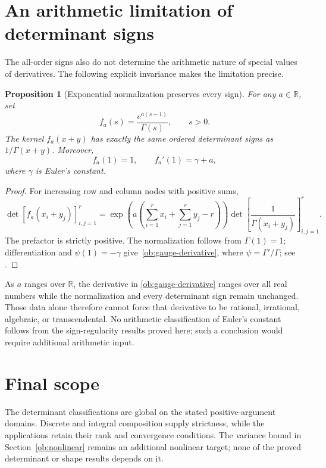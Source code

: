 \documentclass[11pt,a4paper]{article}
\newtheorem{proposition}[theorem]{Proposition}
\theoremstyle{definition}
\theoremstyle{remark}
\newcommand{\R}{\mathbb R}
\begin{document}
\section{An arithmetic limitation of determinant signs}
\label{ob:arithmetic}

The all-order signs also do not determine the arithmetic nature of
special values of derivatives. The following explicit invariance
makes the limitation precise.

\begin{proposition}[Exponential normalization preserves every sign]
\label{ob:gauge}
For any \(a\in\R\), set
\[
 f_a(s)=\frac{e^{a(s-1)}}{\Gamma(s)},\qquad s>0.
\]
The kernel \(f_a(x+y)\) has exactly the same ordered determinant
signs as \(1/\Gamma(x+y)\). Moreover,
\begin{equation}\label{ob:gauge-derivative}
 f_a(1)=1,\qquad f_a'(1)=\gamma+a,
\end{equation}
where \(\gamma\) is Euler's constant.
\end{proposition}

\begin{proof}
For increasing row and column nodes with positive sums,
\[
 \det[f_a(x_i+y_j)]_{i,j=1}^r
 =\exp\!\left(a\left(\sum_{i=1}^r x_i+
                       \sum_{j=1}^r y_j-r\right)\right)
   \det\!\left[\frac1{\Gamma(x_i+y_j)}\right]_{i,j=1}^r.
\]
The prefactor is strictly positive. The normalization follows from
\(\Gamma(1)=1\); differentiation and
\(\psi(1)=-\gamma\) give~\eqref{ob:gauge-derivative}, where
\(\psi=\Gamma'/\Gamma\); see \cite[Section~5.4(ii)]{DLMF}.
\end{proof}

As \(a\) ranges over \(\R\), the derivative in
\eqref{ob:gauge-derivative} ranges over all real numbers while the
normalization and every determinant sign remain unchanged. Those
data alone therefore cannot force that derivative to be rational,
irrational, algebraic, or transcendental. No arithmetic classification
of Euler's constant follows from the sign-regularity results proved
here; such a conclusion would require additional arithmetic input.


\section{Final scope}

The determinant classifications are global on the stated
positive-argument domains. Discrete and integral composition supply
strictness, while the applications retain their rank and convergence
conditions. The variance bound in Section~\ref{ob:nonlinear} remains
an additional nonlinear target; none of the proved determinant or
shape results depends on it.
\end{document}
